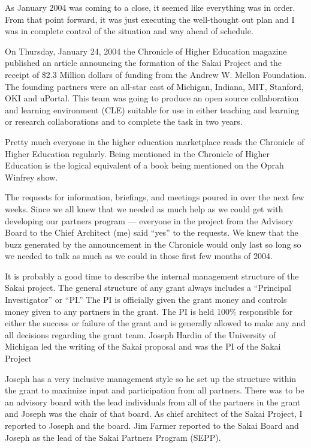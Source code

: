 \documentclass[12pt]{book}
\begin{document}
As January 2004 was coming to a close, it seemed like everything was
in order.   From that point forward, it was just executing the
well-thought out plan and I was in complete control of the situation and
way ahead of schedule.

On Thursday, January 24, 2004 the Chronicle of Higher Education magazine
published an article announcing the formation of the Sakai
Project and the receipt of \$2.3 Million dollars of funding from the
Andrew W. Mellon Foundation.  The founding partners were an all-star cast of
Michigan, Indiana, MIT, Stanford, OKI and uPortal. This team was going to produce
an open source collaboration and learning environment (CLE) suitable for use
in either teaching and learning or research collaborations and to complete the task
in two years.

Pretty much everyone in the higher education marketplace reads the Chronicle
of Higher Education regularly.   Being mentioned in the Chronicle
of Higher Education is the logical equivalent of a book being mentioned on the
Oprah Winfrey show.

The requests for information, briefings, and meetings poured in over
the next few weeks.  Since we all knew that we needed as much help as we could get
with developing our partners program --- everyone in the project from the Advisory Board to
the Chief Architect (me) said ``yes'' to the requests.  We knew that the
buzz generated by the announcement in the Chronicle would only last so long so
we needed to talk as much as we could in those first few months of 2004.

It is probably a good time to describe the internal management structure of the
Sakai project.  The general structure of any grant always includes a
``Principal Investigator'' or ``PI.''  The PI is officially given
the grant money and controls money given to any partners in the grant.
The PI is held 100\% responsible for either the success or failure of the grant
and is generally allowed to make any and all decisions regarding the grant
team.  Joseph Hardin of the University of Michigan led the writing of
the Sakai proposal and was the PI of the Sakai Project

Joseph has a very inclusive management style so he set up the structure within the grant
to maximize input and participation from all partners.  There
was to be an advisory board with the lead individuals from all of the partners
in the grant and Joseph was the chair of that board.  As chief architect of the
Sakai Project, I reported to Joseph and the board.  Jim Farmer reported to
the Sakai Board and Joseph as the lead of the Sakai Partners Program (SEPP).
\end{document}
